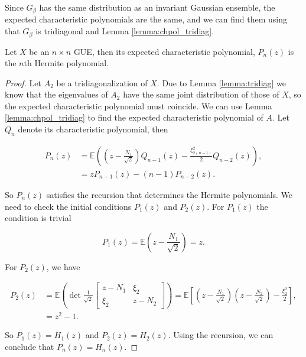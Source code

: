 Since $G_\beta$ has the same distribution as an invariant Gaussian ensemble, the expected characteristic polynomials are the same, and we can find them using that $G_\beta$ is tridiagonal and Lemma \ref{lemma:chpol_tridiag}.



\begin{theorem} \label{thm:dyson_is_hermite}
    Let $X$ be an $n\times n$ GUE, then its expected characteristic polynomial, $P_n(z)$ is the $n$th Hermite polynomial.
\end{theorem}

\begin{proof}
    Let $A_2$ be a tridiagonalization of $X$. Due to Lemma \ref{lemma:tridiag} we know that the eigenvalues of $A_2$ have the same joint distribution of those of $X$, so the expected characteristic polynomial must coincide. We can use Lemma \ref{lemma:chpol_tridiag} to find the expected characteristic polynomial of $A$. Let $Q_n$ denote its characteristic polynomial, then

    \begin{align*}
        P_n(z) &= \mathbb E\left( \left(z - \frac{N_1}{\sqrt2}\right)Q_{n-1}(z) - \frac{\xi_{2(n-1)}^2}{2}Q_{n-2}(z) \right),\\ 
               &= zP_{n-1}(z) - (n-1)P_{n-2}(z).
    \end{align*}

    So $P_n(z)$ satisfies the recursion that determines the Hermite polynomials. We need to check the initial conditions $P_1(z)$ and $P_2(z)$. For $P_1(z)$ the condition is trivial

    \begin{equation*}
        P_1(z) = \mathbb E \left( z - \frac{N_1}{\sqrt{2}} \right) = z.
    \end{equation*}

    For $P_2(z)$, we have

    \begin{align*}
        P_2(z) &= \mathbb E \left( \det \frac1{\sqrt2}\begin{bmatrix}
        z - N_1 & \xi_{2} \\ 
        \xi_2 & z - N_2
        \end{bmatrix} \right) = \mathbb E \left[ \left(z - \frac{N_1}{\sqrt{2}}\right)\left(z - \frac{N_2}{\sqrt{2}}\right) - \frac{\xi_2^2}2 \right],\\ 
        &= z^2 - 1.
    \end{align*}

    So $P_1(z) = H_1(z)$ and $P_2(z) = H_2(z)$. Using the recursion, we can conclude that $P_n(z) = H_n(z)$.
\end{proof}

